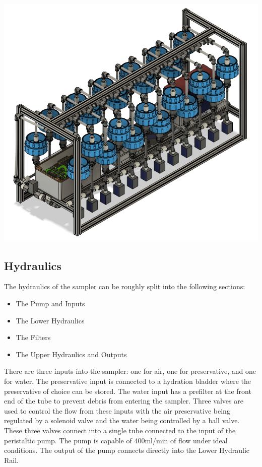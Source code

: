 \documentclass[11pt, letterpaper]{article}
\begin{document}
\begin{center}
	\includegraphics[scale=0.5]{./Assets/Sampler CAD.png} %
\end{center}

\subsection{Hydraulics}
The hydraulics of the sampler can be roughly split into the following sections:
\begin{itemize}
	\item The Pump and Inputs
	\item The Lower Hydraulics
	\item The Filters
	\item The Upper Hydraulics and Outputs
\end{itemize}
There are three inputs into the sampler: one for air, one for preservative, and one for water. The preservative input is connected to a hydration bladder where the preservative of choice can be stored. The water input has a prefilter at the front end of the tube to prevent debris from entering the sampler. Three valves are used to control the flow from these inputs with the air preservative being regulated by a solenoid valve and the water being controlled by a ball valve. These three valves connect into a single tube connected to the input of the peristaltic pump.
The pump is capable of 400ml/min of flow under ideal conditions. The output of the pump connects directly into the Lower Hydraulic Rail. 
\end{document}
